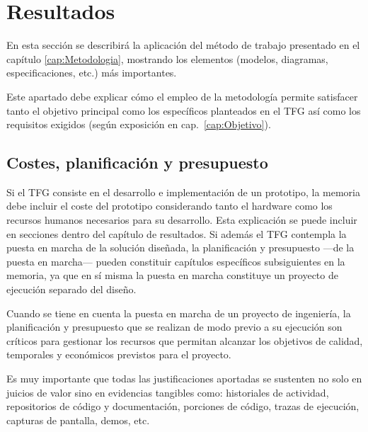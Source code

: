 \chapter{Resultados}
\label{cap:Resultados}

En esta sección se describirá la aplicación del método de trabajo presentado en el capítulo \ref{cap:Metodologia},  mostrando los elementos (modelos, diagramas, especificaciones, etc.) más importantes. 

Este apartado debe explicar cómo el empleo de la metodología permite satisfacer tanto el objetivo principal como los específicos planteados en el TFG así como los requisitos exigidos (según exposición en cap.~\ref{cap:Objetivo}).

\section{Costes, planificación y presupuesto}
Si el TFG consiste en el desarrollo e implementación de un prototipo, la memoria  debe incluir el coste del prototipo considerando tanto el hardware como los recursos humanos necesarios para su desarrollo. Esta explicación se puede incluir en secciones dentro del capítulo de resultados. Si además el TFG contempla la puesta en marcha de la solución diseñada, la planificación y presupuesto ---de la puesta en marcha--- pueden constituir capítulos específicos subsiguientes en la memoria, ya que en sí misma la puesta en marcha constituye un proyecto de ejecución separado del diseño. 

Cuando se tiene en cuenta la puesta en marcha de un proyecto de ingeniería, la planificación y presupuesto que se realizan de modo previo a su ejecución son críticos para gestionar los recursos que permitan alcanzar los objetivos de calidad, temporales y económicos previstos para el proyecto. 

Es muy importante que todas las justificaciones aportadas se sustenten no solo en juicios de valor sino en evidencias tangibles como: historiales de actividad, repositorios de código y documentación, porciones de código, trazas de ejecución, capturas de pantalla, demos, etc.
